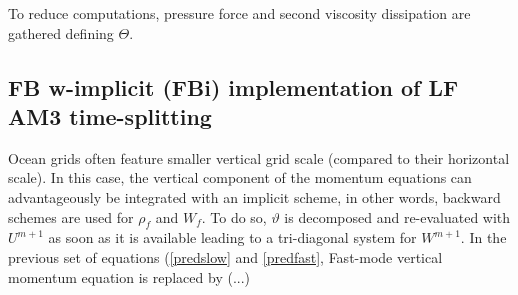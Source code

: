 \documentclass[a4paper]{article}
\numberwithin{equation}{section}
\begin{document}
 To reduce computations, pressure force and second viscosity dissipation are gathered defining $\Theta$. 
 
 
 \subsection{FB w-implicit (FBi) implementation of LF AM3 time-splitting}
 \label{Subsec-FBi}
Ocean grids often feature smaller vertical grid scale (compared to their horizontal scale). In this case, the vertical component of the momentum equations can advantageously be integrated with an implicit scheme, in other words, backward schemes are used for $\rho_f$ and $W_f$. To do so, $\vartheta$ is decomposed and re-evaluated with $U^{m+1}$ as soon as it is available leading to a tri-diagonal system for $W^{m+1}$. In the previous set of equations (\ref{predslow} and \ref{predfast}, Fast-mode vertical momentum equation is replaced by (...)\\
 
\end{document}
